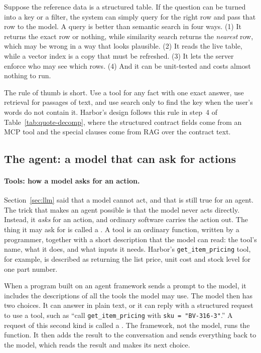 \begin{inpractice}
Suppose the reference data is a structured table. If the question can be turned into a key or a filter, the system can simply query for the right row and pass that row to the model. A query is better than semantic search in four ways. (1) It returns the exact row or nothing, while similarity search returns the \emph{nearest} row, which may be wrong in a way that looks plausible. (2) It reads the live table, while a vector index is a copy that must be refreshed. (3) It lets the server enforce who may see which rows. (4) And it can be unit-tested and costs almost nothing to run.

\medskip
The rule of thumb is short. Use a tool for any fact with one exact answer, use retrieval for passages of text, and use search only to find the key when the user's words do not contain it. Harbor's design follows this rule in step~4 of Table~\ref{tab:quote-decomp}, where the structured contract fields come from an MCP tool and the special clauses come from RAG over the contract text.
\end{inpractice}

\subsection{The agent: a model that can ask for actions}
\label{sec:block-agent}

\paragraph{Tools: how a model asks for an action.} Section~\ref{sec:llm} said that a model cannot act, and that is still true for an agent. The trick that makes an agent possible is that the model never acts directly. Instead, it \emph{asks} for an action, and ordinary software carries the action out. The thing it may ask for is called a . A tool is an ordinary function, written by a programmer, together with a short description that the model can read: the tool's name, what it does, and what inputs it needs. Harbor's \texttt{get\_item\_pricing} tool, for example, is described as returning the list price, unit cost and stock level for one part number.

When a program built on an agent framework sends a prompt to the model, it includes the descriptions of all the tools the model may use. The model then has two choices. It can answer in plain text, or it can reply with a structured request to use a tool, such as ``call \texttt{get\_item\_pricing} with \texttt{sku = "BV-316-3"}.'' A request of this second kind is called a . The framework, not the model, runs the function. It then adds the result to the conversation and sends everything back to the model, which reads the result and makes its next choice.

